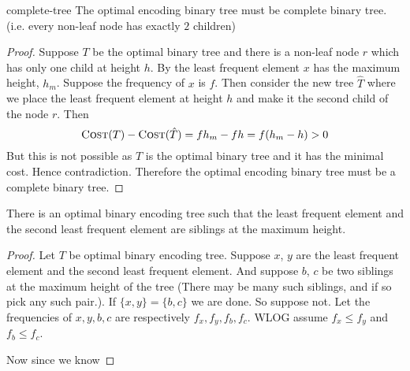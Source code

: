 \begin{lemma}{}{complete-tree}
	The optimal encoding binary tree must be complete binary tree. (i.e. every non-leaf node has exactly $2$ children)
\end{lemma}
\begin{proof}
	Suppose $T$ be the optimal binary tree and there is a non-leaf node $r$ which has only one child at height $h$. 
	By  the least frequent element $x$ has the maximum height, $h_m$. 
	Suppose the frequency of $x$ is $f$. Then consider the new tree $\hat{T}$ where we place the least frequent element at height $h$ and make it the second child of the node $r$. Then $$\textsc{Cost}(T)-\textsc{Cost}(\hat{T})=fh_m-fh=f(h_m-h)>0$$But this is not possible as $T$ is the optimal binary tree and it has the minimal cost. Hence contradiction. Therefore the optimal encoding binary tree must be a complete binary tree. 
\end{proof}
\begin{lemma}{}{}
There is an optimal binary encoding tree such that the least frequent element and the second least frequent element are siblings at the maximum height.
\end{lemma}
\begin{proof}
Let $T$ be optimal binary encoding tree. Suppose $x$, $y$ are the least frequent element and the second least frequent element. And suppose $b$, $c$  be two siblings at the maximum height of the tree (There may be many such siblings, and if so pick any such pair.). If $\{x,y\}=\{b,c\}$ we are done. So suppose not. Let the frequencies of $x,y,b,c$ are respectively $f_x,f_y,f_b,f_c$.  WLOG assume $f_x\leq f_y$ and $f_b\leq f_c$. 

Now since we know 
\end{proof}
